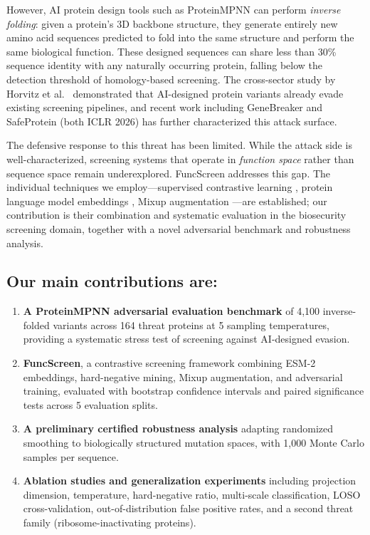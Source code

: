 \documentclass[11pt,a4paper]{article}
\begin{document}
However, AI protein design tools such as ProteinMPNN \cite{dauparas2022robust} can perform \emph{inverse folding}: given a protein's 3D backbone structure, they generate entirely new amino acid sequences predicted to fold into the same structure and perform the same biological function. These designed sequences can share less than 30\% sequence identity with any naturally occurring protein, falling below the detection threshold of homology-based screening. The cross-sector study by Horvitz et al.\ \cite{horvitz2025strengthening} demonstrated that AI-designed protein variants already evade existing screening pipelines, and recent work including GeneBreaker and SafeProtein (both ICLR 2026) has further characterized this attack surface.

The defensive response to this threat has been limited. While the attack side is well-characterized, screening systems that operate in \emph{function space} rather than sequence space remain underexplored. FuncScreen addresses this gap. The individual techniques we employ---supervised contrastive learning \cite{khosla2020supervised}, protein language model embeddings \cite{lin2023evolutionary}, Mixup augmentation \cite{zhang2018mixup}---are established; our contribution is their combination and systematic evaluation in the biosecurity screening domain, together with a novel adversarial benchmark and robustness analysis.

\subsection*{Our main contributions are:}
\begin{enumerate}[leftmargin=*]
    \item \textbf{A ProteinMPNN adversarial evaluation benchmark} of 4,100 inverse-folded variants across 164 threat proteins at 5 sampling temperatures, providing a systematic stress test of screening against AI-designed evasion.
    \item \textbf{FuncScreen}, a contrastive screening framework combining ESM-2 embeddings, hard-negative mining, Mixup augmentation, and adversarial training, evaluated with bootstrap confidence intervals and paired significance tests across 5 evaluation splits.
    \item \textbf{A preliminary certified robustness analysis} adapting randomized smoothing to biologically structured mutation spaces, with 1,000 Monte Carlo samples per sequence.
    \item \textbf{Ablation studies and generalization experiments} including projection dimension, temperature, hard-negative ratio, multi-scale classification, LOSO cross-validation, out-of-distribution false positive rates, and a second threat family (ribosome-inactivating proteins).
\end{enumerate}
\end{document}
